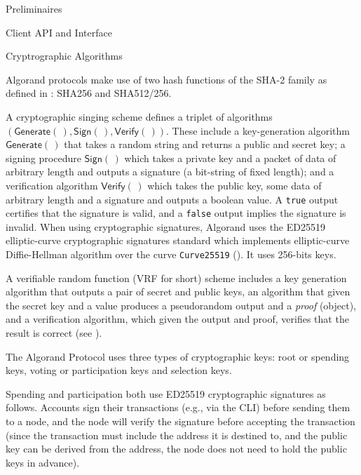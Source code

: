 \documentclass[10pt,a4paper]{article}
\begin{document}
\begin{section}{Preliminaires}
\begin{subsection}{Client API and Interface}
\end{subsection}
\begin{subsection}{Cryptrographic Algorithms}\label{sect:keys}

    Algorand protocols make use of two hash functions of the SHA-2 family
    as defined in \cite{NIST.FIPS.180-4}: SHA256 and SHA512/256.
    
    A cryptographic singing scheme defines a triplet of algorithms $(\mathsf{Generate}(\,),\mathsf{Sign}(\,),\mathsf{Verify}(\,))$. 
    These include a key-generation algorithm $\mathsf{Generate}(\,)$ that takes a random string and
    returns a public and secret key; a signing procedure $\mathsf{Sign}(\,)$ which takes a private key 
    and a packet of data of arbitrary length and outputs a signature (a bit-string of fixed length); and
    a verification algorithm $\mathsf{Verify}(\,)$ which takes the public key, some data of arbitrary 
    length and a signature and outputs a boolean value.
    A {\tt true} output certifies that the signature is valid, and a {\tt false} output implies the 
    signature is invalid.
    When using cryptographic signatures, Algorand uses the ED25519 elliptic-curve cryptographic 
    signatures standard which implements elliptic-curve Diffie-Hellman algorithm over the curve 
    {\tt Curve25519} (\cite{Bernstein:2006}). It uses 256-bits keys. 

    A verifiable random function (VRF for short) scheme includes a key generation algorithm
    that outputs a pair of secret and public keys, an algorithm that given the secret key and 
    a value produces a pseudorandom output and a {\em proof} (object), and 
    a verification algorithm, which given the output and proof, verifies that the result is correct (see 
    \cite{MicaliRabinVadhan:1999}).

    The Algorand Protocol uses three types of cryptographic keys: 
    root or spending keys,
    voting or participation keys and
    selection keys.

    Spending and participation both use ED25519 cryptographic signatures as follows. 
    Accounts sign their transactions (e.g., via the CLI) before sending them to a node, and 
    the node will verify the signature before accepting the transaction (since the transaction
    must include the address it is destined to, and the public key can be derived from the
    address, the node does not need to hold the public keys in advance). 


\end{subsection}
\end{section}
\end{document}
